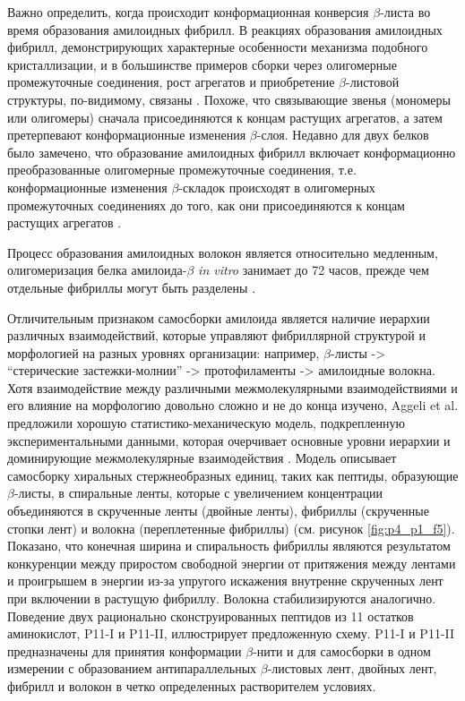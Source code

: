     Важно определить, когда происходит конформационная конверсия $\beta$-листа во время образования амилоидных фибрилл. В реакциях образования амилоидных фибрилл, демонстрирующих характерные особенности механизма подобного кристаллизации, и в большинстве примеров сборки через олигомерные промежуточные соединения, рост агрегатов и приобретение $\beta$-листовой структуры, по-видимому, связаны \cite{jain_evidence_2008,kumar_mechanism_2007,serio_nucleated_2000,modler_assembly_2003,esler_alzheimers_2000,scheibel_elongation_2004}. Похоже, что связывающие звенья (мономеры или олигомеры) сначала присоединяются к концам растущих агрегатов, а затем претерпевают конформационные изменения $\beta$-слоя. Недавно для двух белков было замечено, что образование амилоидных фибрилл включает конформационно преобразованные олигомерные промежуточные соединения, т.е. конформационные изменения $\beta$-складок происходят в олигомерных промежуточных соединениях до того, как они присоединяются к концам растущих агрегатов \cite{chimon_evidence_2007}.
    
    Процесс образования амилоидных волокон является относительно медленным, олигомеризация белка амилоида-$\beta$ \textit{in vitro} занимает до 72 часов, прежде чем отдельные фибриллы могут быть разделены \cite{chimon_evidence_2007}.
    
    Отличительным признаком самосборки амилоида является наличие иерархии различных взаимодействий, которые управляют фибриллярной структурой и морфологией на разных уровнях организации: например, $\beta$-листы -> ``стерические застежки-молнии'' -> протофиламенты -> амилоидные волокна. Хотя взаимодействие между различными межмолекулярными взаимодействиями и его влияние на морфологию довольно сложно и не до конца изучено, Aggeli et al. предложили хорошую статистико-механическую модель, подкрепленную экспериментальными данными, которая очерчивает основные уровни иерархии и доминирующие межмолекулярные взаимодействия \cite{aggeli_hierarchical_2001}. Модель описывает самосборку хиральных стержнеобразных единиц, таких как пептиды, образующие $\beta$-листы, в спиральные ленты, которые с увеличением концентрации объединяются в скрученные ленты (двойные ленты), фибриллы (скрученные стопки лент) и волокна (переплетенные фибриллы) (см. рисунок \ref{fig:p4_p1_f5}). Показано, что конечная ширина и спиральность фибриллы являются результатом конкуренции между приростом свободной энергии от притяжения между лентами и проигрышем в энергии из-за упругого искажения внутренне скрученных лент при включении в растущую фибриллу. Волокна стабилизируются аналогично. Поведение двух рационально сконструированных пептидов из 11 остатков аминокислот, P11-I и P11-II, иллюстрирует предложенную схему. P11-I и P11-II предназначены для принятия конформации $\beta$-нити и для самосборки в одном измерении с образованием антипараллельных $\beta$-листовых лент, двойных лент, фибрилл и волокон в четко определенных растворителем условиях.

